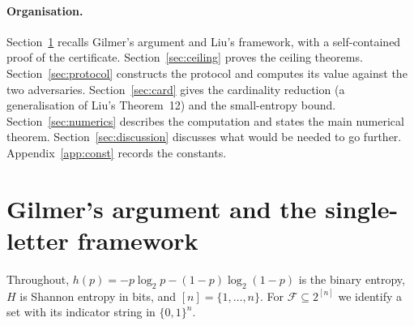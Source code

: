 \documentclass[11pt,a4paper]{article}
\theoremstyle{definition}
\theoremstyle{remark}
\newcommand{\F}{\mathcal{F}}
\newcommand{\ent}{h}
\begin{document}
\paragraph{Organisation.} Section~\ref{sec:framework} recalls Gilmer's argument and Liu's framework, with a self-contained proof of the certificate. Section~\ref{sec:ceiling} proves the ceiling theorems. Section~\ref{sec:protocol} constructs the protocol and computes its value against the two adversaries. Section~\ref{sec:card} gives the cardinality reduction (a generalisation of Liu's Theorem~12) and the small-entropy bound. Section~\ref{sec:numerics} describes the computation and states the main numerical theorem. Section~\ref{sec:discussion} discusses what would be needed to go further. Appendix~\ref{app:const} records the constants.

\section{Gilmer's argument and the single-letter framework}\label{sec:framework}
Throughout, $\ent(p)=-p\log_2p-(1-p)\log_2(1-p)$ is the binary entropy, $H$ is Shannon entropy in bits, and $[n]=\{1,\dots,n\}$. For $\F\subseteq2^{[n]}$ we identify a set with its indicator string in $\{0,1\}^n$.
\end{document}
